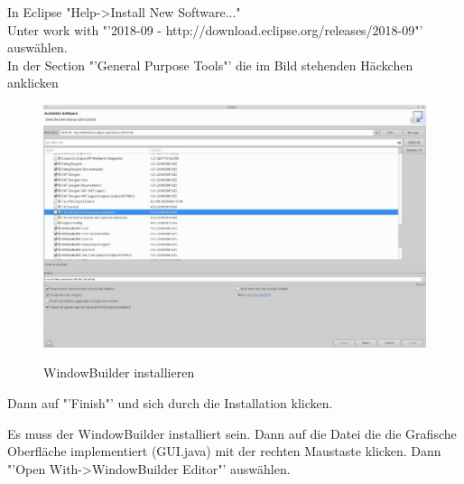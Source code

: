 In Eclipse "Help->Install New Software..."\\
Unter work with "'2018-09 - http://download.eclipse.org/releases/2018-09"' auswählen.\\
In der Section "'General Purpose Tools"' die im Bild stehenden Häckchen anklicken\\	
\begin{figure}[hbtp]
\centering
\includegraphics[scale=0.4]{Bilder/installWindowBuilder}\\
\caption{WindowBuilder installieren}
\end{figure}
Dann auf "'Finish"' und sich durch die Installation klicken.
\nsecend

Es muss der WindowBuilder installiert sein. Dann auf die Datei die die Grafische Oberfläche implementiert (GUI.java) mit der rechten Maustaste klicken. Dann "'Open With->WindowBuilder Editor"' auswählen.
\nsecend
\nsecend


